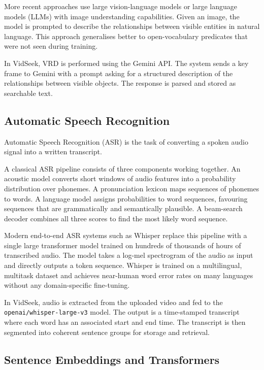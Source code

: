 \documentclass[12pt, a4paper]{report}
\begin{document}
More recent approaches use large vision-language models or large language
models (LLMs) with image understanding capabilities. Given an image, the
model is prompted to describe the relationships between visible entities in
natural language. This approach generalises better to open-vocabulary predicates
that were not seen during training.

In VidSeek, VRD is performed using the Gemini API. The system sends a key
frame to Gemini with a prompt asking for a structured description of the
relationships between visible objects. The response is parsed and stored as
searchable text.

\subsection{Automatic Speech Recognition}

Automatic Speech Recognition (ASR) is the task of converting a spoken audio
signal into a written transcript.

A classical ASR pipeline consists of three components working together.
An acoustic model converts short windows of audio features into a probability
distribution over phonemes. A pronunciation lexicon maps sequences of phonemes
to words. A language model assigns probabilities to word sequences, favouring
sequences that are grammatically and semantically plausible. A beam-search
decoder combines all three scores to find the most likely word sequence.

Modern end-to-end ASR systems such as Whisper \cite{radford2023whisper}
replace this pipeline with a single large transformer model trained on
hundreds of thousands of hours of transcribed audio. The model takes a
log-mel spectrogram of the audio as input and directly outputs a token sequence.
Whisper is trained on a multilingual, multitask dataset and achieves near-human
word error rates on many languages without any domain-specific fine-tuning.

In VidSeek, audio is extracted from the uploaded video and fed to the
\texttt{openai/whisper-large-v3} model. The output is a time-stamped transcript
where each word has an associated start and end time. The transcript is then
segmented into coherent sentence groups for storage and retrieval.

\subsection{Sentence Embeddings and Transformers}
\end{document}

